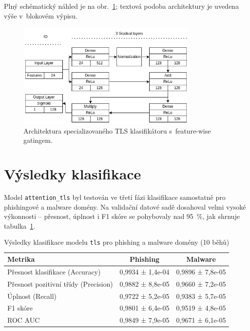 Plný schématický náhled je na obr.~\ref{fig:tls_classifier_architecture}; textová podoba architektury je uvedena výše v~blokovém výpisu.

\begin{figure}[H]
\centering
\includegraphics[width=0.8\textwidth]{obrazky-figures/tls_attention.png}
\caption{Architektura specializovaného TLS klasifikátoru s~feature-wise gatingem.}
\label{fig:tls_classifier_architecture}
\end{figure}

\section*{Výsledky klasifikace}
\label{appendix:tls-results}

Model \texttt{attention\_tls} byl testován ve třetí fázi klasifikace samostatně pro phishingové a malware domény. Na validační datové sadě dosahoval velmi vysoké výkonnosti – přesnost, úplnost i F1 skóre se pohybovaly nad 95~\%, jak shrnuje tabulka~\ref{tab:attention_tls_results}.


\begin{table}[h!]
    \centering
        \begin{tabular}{|l|c|c|}
            \hline
            \textbf{Metrika} & \textbf{Phishing} & \textbf{Malware} \\
            \hline
            Přesnost klasifikace (Accuracy)& 0{,}9934 ± 1{,}4e-04 & 0{,}9896 ± 7{,}8e-05 \\
            Přesnost pozitivní třídy (Precision)    & 0{,}9882 ± 8{,}8e-05 & 0{,}9660 ± 7{,}2e-05 \\
            Úplnost (Recall)        & 0{,}9722 ± 5{,}2e-05 & 0{,}9383 ± 5{,}7e-05 \\
            F1 skóre                & 0{,}9801 ± 6{,}4e-05 & 0{,}9519 ± 4{,}8e-05 \\
            ROC AUC                 & 0{,}9849 ± 7{,}9e-05 & 0{,}9671 ± 6{,}1e-05 \\
            \hline
        \end{tabular}
        \caption{Výsledky klasifikace modelu \texttt{tls} pro phishing a malware domény (10 běhů)}
    \label{tab:attention_tls_results}
\end{table}

